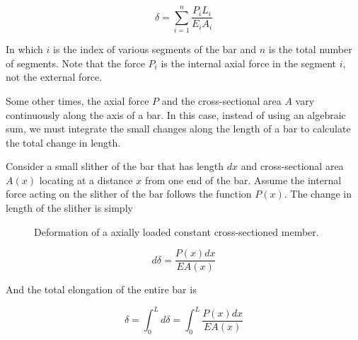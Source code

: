 \documentclass[
10pt,
a4paper,
openany,
svgnames,
]{book} %
\begin{document}
\begin{equation}
  \delta  = \sum\limits_{i = 1}^n \frac{{P_i}{L_i}}{{E_i}{A_i}}
\end{equation}

In which $i$ is the index of various segments of the bar and $n$ is the total number of segments. Note that the force $P_i$ is the internal axial force in the segment $i$, not the external force.

Some other times, the axial force $P$ and the cross-sectional area $A$ vary continuously along the axis of a bar. In this case, instead of using an algebraic sum, we must integrate the small changes along the length of a bar to calculate the total change in length.

Consider a small slither of the bar that has length $dx$ and cross-sectional area $A(x)$ locating at a distance $x$ from one end of the bar. Assume the internal force acting on the slither of the bar follows the function $P(x)$. The change in length of the slither is simply

\begin{figure}[h]
  \centering
  \caption{Deformation of a axially loaded constant cross-sectioned member.}
\end{figure}

  \[d\delta  = \frac{{P(x)dx}}{{EA(x)}}\]

And the total elongation of the entire bar is

\begin{equation}
  \delta  = \int_0^L {d\delta }  = \int_0^L {\frac{{P(x)dx}}{{EA(x)}}}
\end{equation}
\end{document}
